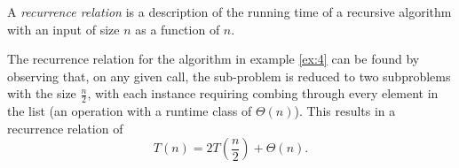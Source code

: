 \documentclass{article}
\begin{document}
 \begin{definition}\label{def:recurrence}
  A \emph{recurrence relation} is a description of the running time of a recursive algorithm with an input of size $n$ as a function of $n$.\cite{blum06}
 \end{definition}
 \begin{example}\label{ex:5}
  The recurrence relation for the algorithm in example \ref{ex:4} can be found by observing that, on any given call, the sub-problem is reduced to two subproblems with the size $\frac{n}{2}$, with each instance requiring combing through every element in the list (an operation with a runtime class of $\Theta(n)$). This results in a recurrence relation of
  $$ T(n) = 2T\left(\frac{n}{2}\right) + \Theta(n). $$
 \end{example}
\end{document}
